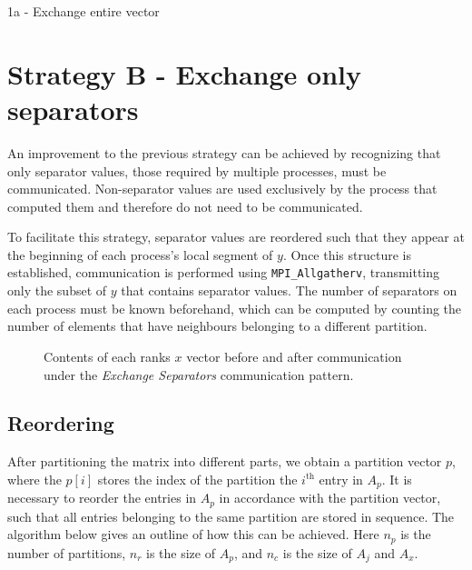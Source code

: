 \begin{algorithm}[H]
    \caption{1a - Exchange entire vector}
    \SetAlgoVlined


\end{algorithm}

\section{Strategy B - Exchange only separators}

An improvement to the previous strategy can be achieved by recognizing that only separator values, those required by multiple processes, must be communicated. Non-separator values are used exclusively by the process that computed them and therefore do not need to be communicated.

To facilitate this strategy, separator values are reordered such that they appear at the beginning of each process's local segment of \(y\). Once this structure is established, communication is performed using \texttt{MPI\_Allgatherv}, transmitting only the subset of \(y\) that contains separator values. The number of separators on each process must be known beforehand, which can be computed by counting the number of elements that have neighbours belonging to a different partition.

\begin{figure}[ht]
    \centering
    \caption{Contents of each ranks \(x\) vector before and after communication under the \textit{Exchange Separators} communication pattern.}
    \label{fig:1bcomm}
\end{figure}


\subsection{Reordering}
After partitioning the matrix into different parts, we obtain a partition vector \(p\), where the \(p[i]\) stores the index of the partition the \(i^{\text{th}}\) entry in \(A_{p}\). It is necessary to reorder the entries in \(A_{p}\) in accordance with the partition vector, such that all entries belonging to the same partition are stored in sequence. The algorithm below gives an outline of how this can be achieved. Here \(n_{p}\) is the number of partitions, \(n_{r}\) is the size of \(A_{p}\), and \(n_{c}\) is the size of \(A_{j}\) and \(A_{x}\).

